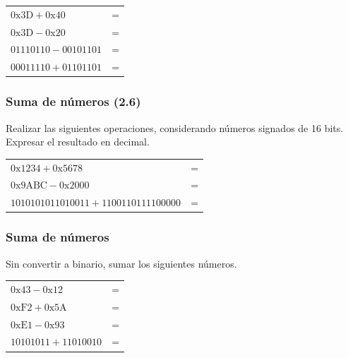 \begin{ejercicioClase}
    \begin{tabular}{lc}
      $\mathrm{0x3D} + \mathrm{0x40} $&=\underspace\\
      $\mathrm{0x3D} - \mathrm{0x20} $&=\underspace\\
      $\mathrm{01110110} - \mathrm{00101101}$&=\underspace\\
      $\mathrm{00011110} + \mathrm{01101101}$&=\underspace\\
    \end{tabular}

    \subsubsection{Suma de números (2.6)}
    Realizar las siguientes operaciones, considerando números signados de 16 bits. Expresar el resultado en decimal.

    \vspace{10mm}
    \begin{tabular}{lc}
      $\mathrm{0x1234} + \mathrm{0x5678}$&=\underspace\\
      $\mathrm{0x9ABC} - \mathrm{0x2000}$&=\underspace\\
      $\mathrm{10101010 11010011} + \mathrm{11001101 11100000}$&=\underspace\\
    \end{tabular}

    \subsubsection{Suma de números}
    Sin convertir a binario, sumar los siguientes números.

    \begin{tabular}{lc}
      $\mathrm{0x43} - \mathrm{0x12}$&=\underspace\\
      $\mathrm{0xF2} + \mathrm{0x5A}$&=\underspace\\
      $\mathrm{0xE1} - \mathrm{0x93}$&=\underspace\\
      $\mathrm{10101011} + \mathrm{11010010}$&=\underspace\\
    \end{tabular}
    
\end{ejercicioClase}

